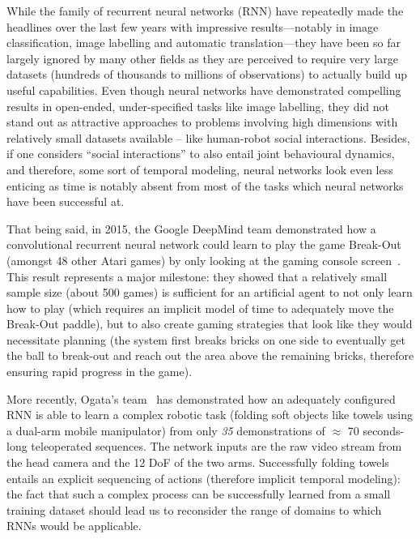 \documentclass{article}
\begin{document}
While the family of recurrent neural networks (RNN) have repeatedly made the
headlines over the last few years with impressive results---notably in image
classification, image labelling and automatic translation---they have been so far 
largely ignored by  many other fields as they are perceived to require very
large datasets (hundreds of thousands to millions of observations) to actually
build up useful capabilities. 
Even though neural networks have demonstrated
compelling results in open-ended, under-specified tasks like image labelling, they
did not stand out as attractive approaches to problems involving high dimensions
with relatively small datasets available -- like human-robot social
interactions.
Besides, if one considers ``social interactions'' to also entail joint
behavioural dynamics, and therefore, some sort of temporal modeling, neural
networks look even less enticing as time is notably absent from most of the
tasks which neural networks have been successful at.

That being said, in 2015, the Google DeepMind team demonstrated how a convolutional
recurrent neural network could learn to play the game Break-Out (amongst
48 other Atari games) by only looking at the gaming console
screen~\cite{mnih2015human}. This result represents a major milestone: they showed
that a relatively small sample size (about 500 games) is sufficient for an 
artificial agent to not only learn how to play (which requires an implicit model 
of time to adequately move the Break-Out paddle), but to also create gaming 
strategies that look like they would necessitate planning (the system first
breaks bricks on one side to eventually get the ball to break-out and reach out the area
above the remaining bricks, therefore ensuring rapid progress in the
game).

More recently, Ogata's team~\cite{yang2017repeatable} has demonstrated how an
adequately configured RNN is able to learn a complex robotic task (folding soft
objects like towels using a dual-arm mobile manipulator) from only \emph{35}
demonstrations of $\approx$ 70 seconds-long teleoperated
sequences. The network inputs are the raw video stream from the head camera and the
12 DoF of the two arms. Successfully folding towels entails an explicit sequencing of
actions (therefore implicit temporal modeling): the fact that such a complex
process can be successfully learned from a small training dataset should lead
us to reconsider the range of domains to which RNNs would be applicable.
\end{document}

